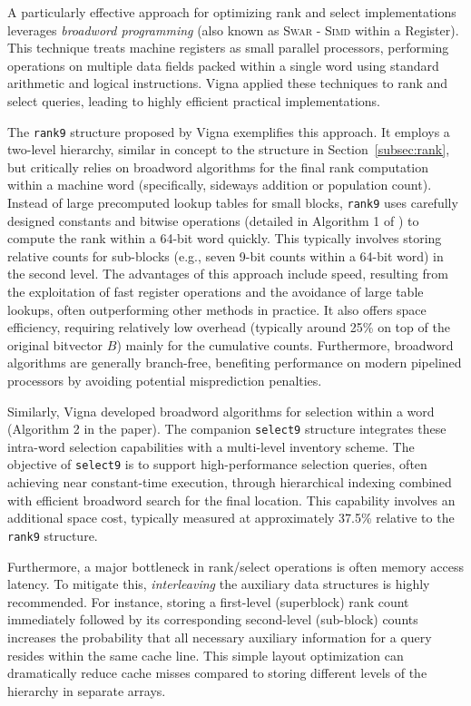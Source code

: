 A particularly effective approach for optimizing \textsf{rank} and \textsf{select} implementations leverages \emph{broadword programming} (also known as \textsc{Swar} - \textsc{Simd} within a Register). This technique treats machine registers as small parallel processors, performing operations on multiple data fields packed within a single word using standard arithmetic and logical instructions. Vigna \cite{vigna2008broadword} applied these techniques to \textsf{rank} and \textsf{select} queries, leading to highly efficient practical implementations.

The \texttt{rank9} structure proposed by Vigna \cite{vigna2008broadword} exemplifies this approach. It employs a two-level hierarchy, similar in concept to the structure in Section~\ref{subsec:rank}, but critically relies on broadword algorithms for the final \textsf{rank} computation within a machine word (specifically, sideways addition or population count). Instead of large precomputed lookup tables for small blocks, \texttt{rank9} uses carefully designed constants and bitwise operations (detailed in Algorithm 1 of \cite{vigna2008broadword}) to compute the \textsf{rank} within a 64-bit word quickly. This typically involves storing relative counts for sub-blocks (e.g., seven 9-bit counts within a 64-bit word) in the second level. The advantages of this approach include speed, resulting from the exploitation of fast register operations and the avoidance of large table lookups, often outperforming other methods in practice. It also offers space efficiency, requiring relatively low overhead (typically around 25\% on top of the original bitvector $B$) mainly for the cumulative counts. Furthermore, broadword algorithms are generally branch-free, benefiting performance on modern pipelined processors by avoiding potential misprediction penalties.

Similarly, Vigna \cite{vigna2008broadword} developed broadword algorithms for selection within a word (Algorithm 2 in the paper). The companion \texttt{select9} structure integrates these intra-word selection capabilities with a multi-level inventory scheme. The objective of \texttt{select9} is to support high-performance selection queries, often achieving near constant-time execution, through hierarchical indexing combined with efficient broadword search for the final location. This capability involves an additional space cost, typically measured at approximately 37.5\% relative to the \texttt{rank9} structure.

Furthermore, a major bottleneck in \textsf{rank}/\textsf{select} operations is often memory access latency. To mitigate this, \emph{interleaving} the auxiliary data structures is highly recommended. For instance, storing a first-level (superblock) rank count immediately followed by its corresponding second-level (sub-block) counts increases the probability that all necessary auxiliary information for a query resides within the same cache line. This simple layout optimization can dramatically reduce cache misses compared to storing different levels of the hierarchy in separate arrays.
